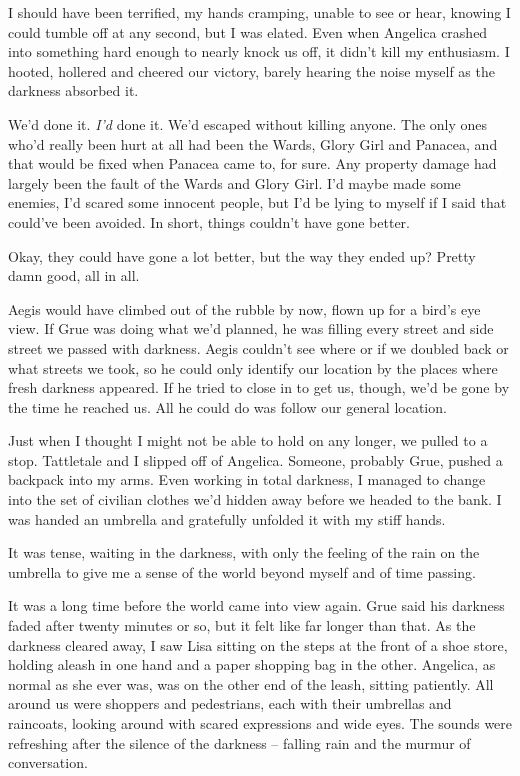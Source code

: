 I should have been terrified, my hands cramping, unable to see or hear, knowing I could tumble off at any second, but I was elated.  Even when Angelica crashed into something hard enough to nearly knock us off, it didn't kill my enthusiasm.  I hooted, hollered and cheered our victory, barely hearing the noise myself as the darkness absorbed it.



We'd done it.  \emph{I'd} done it.  We'd escaped without killing anyone.  The only ones who'd really been hurt at all had been the Wards, Glory Girl and Panacea, and that would be fixed when Panacea came to, for sure.  Any property damage had largely been the fault of the Wards and Glory Girl.  I'd maybe made some enemies, I'd scared some innocent people, but I'd be lying to myself if I said that could've been avoided.  In short, things couldn't have gone better.



Okay, they could have gone a lot better, but the way they ended up?  Pretty damn good, all in all.



Aegis would have climbed out of the rubble by now, flown up for a bird's eye view.  If Grue was doing what we'd planned, he was filling every street and side street we passed with darkness.  Aegis couldn't see where or if we doubled back or what streets we took, so he could only identify our location by the places where fresh darkness appeared.  If he tried to close in to get us, though, we'd be gone by the time he reached us.  All he could do was follow our general location.



Just when I thought I might not be able to hold on any longer, we pulled to a stop.  Tattletale and I slipped off of Angelica.  Someone, probably Grue, pushed a backpack into my arms.  Even working in total darkness, I managed to change into the set of civilian clothes we'd hidden away before we headed to the bank.  I was handed an umbrella and gratefully unfolded it with my stiff hands.



It was tense, waiting in the darkness, with only the feeling of the rain on the umbrella to give me a sense of the world beyond myself and of time passing.



It was a long time before the world came into view again.  Grue said his darkness faded after twenty minutes or so, but it felt like far longer than that.  As the darkness cleared away, I saw Lisa sitting on the steps at the front of a shoe store, holding aleash in one hand and a paper shopping bag in the other.  Angelica, as normal as she ever was, was on the other end of the leash, sitting patiently.  All around us were shoppers and pedestrians, each with their umbrellas and raincoats, looking around with scared expressions and wide eyes.  The sounds were refreshing after the silence of the darkness – falling rain and the murmur of conversation.



